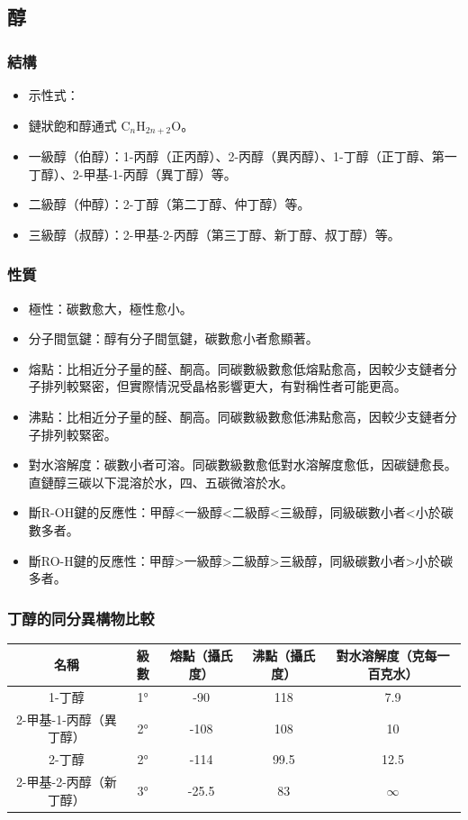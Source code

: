 \documentclass[a4paper,12pt]{report}
\begin{document}
\begin{itemize}
\subsection{醇}
\subsubsection{結構}
\begin{itemize}
\item 示性式：
\item 鏈狀飽和醇通式 C$_n$H$_{2n+2}$O。
\item 一級醇（伯醇）：1-丙醇（正丙醇）、2-丙醇（異丙醇）、1-丁醇（正丁醇、第一丁醇）、2-甲基-1-丙醇（異丁醇）等。
\item 二級醇（仲醇）：2-丁醇（第二丁醇、仲丁醇）等。
\item 三級醇（叔醇）：2-甲基-2-丙醇（第三丁醇、新丁醇、叔丁醇）等。
\end{itemize}
\subsubsection{性質}
\begin{itemize}
\item 極性：碳數愈大，極性愈小。
\item 分子間氫鍵：醇有分子間氫鍵，碳數愈小者愈顯著。
\item 熔點：比相近分子量的醛、酮高。同碳數級數愈低熔點愈高，因較少支鏈者分子排列較緊密，但實際情況受晶格影響更大，有對稱性者可能更高。
\item 沸點：比相近分子量的醛、酮高。同碳數級數愈低沸點愈高，因較少支鏈者分子排列較緊密。
\item 對水溶解度：碳數小者可溶。同碳數級數愈低對水溶解度愈低，因碳鏈愈長。直鏈醇三碳以下混溶於水，四、五碳微溶於水。
\item 斷R-OH鍵的反應性：甲醇<一級醇<二級醇<三級醇，同級碳數小者<小於碳數多者。
\item 斷RO-H鍵的反應性：甲醇>一級醇>二級醇>三級醇，同級碳數小者>小於碳多者。
\end{itemize}
\subsubsection{丁醇的同分異構物比較}
\begin{longtable}[c]{|c|c|c|c|c|}
\hline
名稱 & 級數 & 熔點（攝氏度） & 沸點（攝氏度） & 對水溶解度（克每一百克水）\\\hline
1-丁醇 & 1° & -90 & 118 & 7.9\\\hline
2-甲基-1-丙醇（異丁醇） & 2° & -108 & 108 & 10\\\hline
2-丁醇 & 2° & -114 & 99.5 & 12.5\\\hline
2-甲基-2-丙醇（新丁醇） & 3° & -25.5 & 83 & $\infty$\\\hline
\end{longtable}

\end{itemize}
\end{document}
